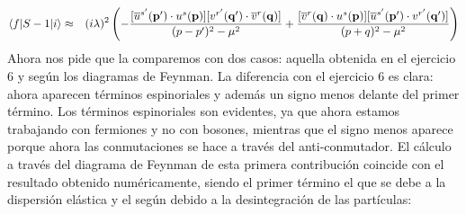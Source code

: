 \begin{solucion}
	\begin{eqnarray*}
		\mel**{f}{S-1}{i}  & \approx & (i\lambda)^2 \left( -\frac{[\overline{u}^{s'}(\mathbf{p}') \cdot u^{s}(\mathbf{p})]  [v^{r'}(\mathbf{q}') \cdot \overline{v}^{r}(\mathbf{q})]}{(p-p')^2 - \mu^2}+\frac{[\overline{v}^{r}(\mathbf{q}) \cdot u^{s}(\mathbf{p})] [\overline{u}^{s'}(\mathbf{p}') \cdot v^{r'}(\mathbf{q}')]}{(p+q)^2 - \mu^2} \right)
	\end{eqnarray*}	
	Ahora nos pide que la comparemos con dos casos: aquella obtenida en el ejercicio 6 y según los diagramas de Feynman. La diferencia con el ejercicio 6 es clara: ahora aparecen términos espinoriales y además un signo menos delante del primer término. Los términos espinoriales son evidentes, ya que ahora estamos trabajando con fermiones y no con bosones, mientras que el signo menos aparece porque ahora las conmutaciones se hace a través del anti-conmutador. El cálculo a través del diagrama de Feynman de esta primera contribución coincide con el resultado obtenido numéricamente, siendo el primer término el que se debe a la dispersión elástica y el según debido a la desintegración de las partículas:
	
	\begin{center}
	\end{center}
	\begin{center}
	\end{center}
	

\end{solucion}



